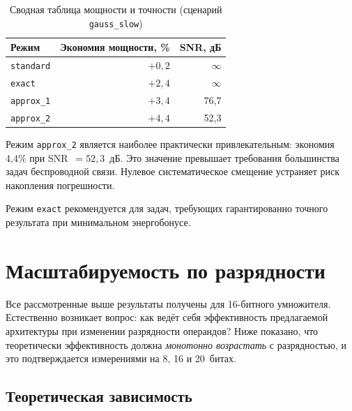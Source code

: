 \documentclass[a4paper, 12pt, oneside]{report}
\begin{document}
\begin{table}[H]
  \caption{Сводная таблица мощности и точности
           (сценарий \texttt{gauss\_slow})}
  \label{tab:tradeoff}
  \centering
  \renewcommand{\arraystretch}{1.3}
  \begin{tabular}{lrr}
    \toprule
    Режим & Экономия мощности, \% & SNR, дБ \\
    \midrule
    \texttt{standard}  & $+0{,}2$ & $\infty$ \\
    \texttt{exact}     & $+2{,}4$ & $\infty$ \\
    \texttt{approx\_1} & $+3{,}4$ & 76{,}7   \\
    \texttt{approx\_2} & $+4{,}4$ & 52{,}3   \\
    \bottomrule
  \end{tabular}
\end{table}

Режим \texttt{approx\_2} является наиболее практически привлекательным:
экономия 4{,}4\% при SNR~$= 52{,}3$~дБ. Это значение превышает
требования большинства задач беспроводной связи. Нулевое
систематическое смещение устраняет риск накопления погрешности.

Режим \texttt{exact} рекомендуется для задач, требующих
гарантированно точного результата при минимальном энергобонусе.

\section{Масштабируемость по разрядности}

Все рассмотренные выше результаты получены для 16-битного умножителя.
Естественно возникает вопрос: как ведёт себя эффективность предлагаемой
архитектуры при изменении разрядности операндов? Ниже показано, что
теоретически эффективность должна \textit{монотонно возрастать} с
разрядностью, и это подтверждается измерениями на 8, 16 и 20~битах.

\subsection{Теоретическая зависимость}
\end{document}

